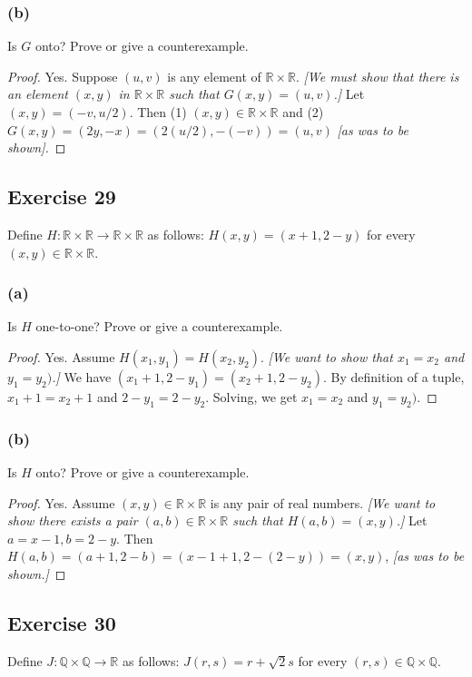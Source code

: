 \documentclass[14pt]{extarticle}
\newcommand{\R}{\mathbb{R}}
\newcommand{\Q}{\mathbb{Q}}
\begin{document}
\subsubsection{(b)}
Is $G$ onto? Prove or give a counterexample.

\begin{proof}
    Yes. Suppose \((u, v)\) is any element of \(\R \times \R\). {\it [We must show that there is an element \((x, y)\) in
                \(\R \times \R\) such that \(G(x, y) = (u, v)\).]} Let \((x, y) = (-v, u/2)\). Then (1) \((x, y) \in \R \times \R\)
    and (2) \(G(x, y) = (2y, -x) = (2(u/2), -(-v)) = (u, v)\) {\it [as was to be shown].}
\end{proof}

\subsection{Exercise 29}
Define \(H: \R \times \R \to \R \times \R\) as follows: \(H(x, y) = (x+1, 2-y)\) for every \((x, y) \in \R \times \R\).

\subsubsection{(a)}
Is $H$ one-to-one? Prove or give a counterexample.

\begin{proof}
    Yes. Assume \(H(x_1, y_1) = H(x_2, y_2)\). {\it [We want to show that \(x_1 = x_2\) and \(y_1 = y_2)\).]}
    We have \((x_1+1, 2-y_1) = (x_2+1, 2-y_2)\). By definition of a tuple, \(x_1+1 = x_2+1\) and \(2-y_1 = 2-y_2\).
    Solving, we get \(x_1 = x_2\) and \(y_1 = y_2)\).
\end{proof}

\subsubsection{(b)}
Is $H$ onto? Prove or give a counterexample.

\begin{proof}
    Yes. Assume \((x,y) \in \R \times \R\) is any pair of real numbers. {\it [We want to show there exists a pair
                \((a, b) \in \R \times \R\) such that \(H(a,b) = (x,y)\).]} Let \(a = x-1, b = 2-y\). Then \(H(a, b) = (a+1, 2-b) =
    (x-1+1, 2-(2-y)) = (x,y)\), {\it [as was to be shown.]}
\end{proof}

\subsection{Exercise 30}
Define \(J: \Q \times \Q \to \R\) as follows: \(J(r, s) = r + \sqrt{2}s\) for every \((r, s) \in \Q \times \Q\).
\end{document}
